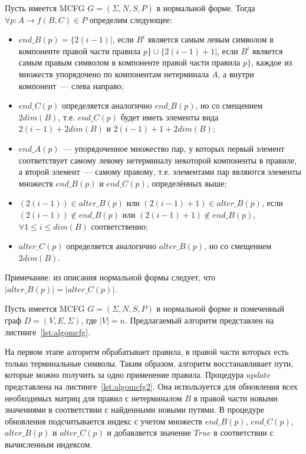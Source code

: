 \begin{definition}
	\label{def:sets-end-alter}
	Пусть имеется MCFG $G = (\Sigma, N, S, P)$ в нормальной форме. Тогда $\forall p: A \rightarrow f(B,C) \in P$ определим следующее:
	\begin{itemize}
		\item $end\_B(p) = \{2(i - 1)|$, если $B^i$ является самым левым символом в компоненте правой части правила $p\} \cup \{2(i - 1) + 1 |$, если $B^i$ является самым правым символом в компоненте правой части правила $p\}$, каждое из множеств упорядочено по компонентам нетерминала $A$, а внутри компонент~--- слева направо;
		\item $end\_C(p)$ определяется аналогично $end\_B(p)$, но со смещением $2dim(B)$, т.е. $end\_C(p)$ будет иметь элементы вида $2(i - 1) + 2dim(B)$ и $2(i - 1) + 1 + 2dim(B)$;
		\item $end\_A(p)$~--- упорядоченное множество пар, у которых первый элемент соответствует самому левому нетерминалу некоторой компоненты в правиле, а второй элемент~--- самому правому, т.е. элементами пар являются элементы множеств $end\_B(p)$ и $end\_C(p)$, определённых выше;
		\item $(2(i - 1)) \in alter\_B(p)$ или $(2(i - 1) + 1) \in alter\_B(p)$, если $(2(i - 1)) \notin end\_B(p)$ или $(2(i - 1) + 1) \notin end\_B(p)$, $\forall 1 \leq i \leq dim(B)$ соответственно;
		\item $alter\_C(p)$ определяется аналогично $alter\_B(p)$, но со смещением $2dim(B)$.
	\end{itemize}
\end{definition}

Примечание: из описания нормальной формы следует, что $|alter\_B(p)| = |alter\_C(p)|$.

Пусть имеется MCFG $G = (\Sigma, N, S, P)$ в нормальной форме и помеченный граф $D = (V, E, \Sigma)$, где $|V| = n$. Предлагаемый алгоритм представлен на листинге~\ref{lst:algomcfg}.

На первом этапе алгоритм обрабатывает правила, в правой части которых есть только терминальные символы. Таким образом, алгоритм восстанавливает пути, которые можно получить за одно применение правила. Процедура $update$ представлена на листинге~\ref{lst:algomcfg2}. Она используется для обновления всех необходимых матриц для правил с нетерминалом $B$ в правой части новыми значениями в соответствии с найденными новыми путями. В процедуре обновления подсчитывается индекс с учетом множеств $end\_B(p)$, $end\_C(p)$, $alter\_B(p)$ и $alter\_C(p)$ и добавляется значение $True$ в соответствии с вычисленным индексом.

